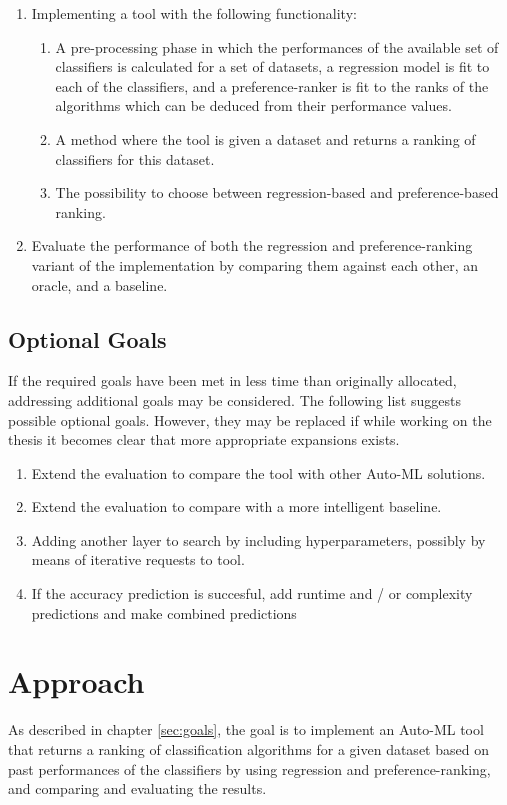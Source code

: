 \documentclass[12pt]{scrartcl}
\begin{document}
\begin{enumerate}
	\item Implementing a tool with the following functionality:
	\begin{enumerate}
		\item A pre-processing phase in which the performances of the available set of classifiers is calculated for a set of datasets, a regression model is fit to each of the classifiers, and a preference-ranker is fit to the ranks of the algorithms which can be deduced from their performance values.
		\item A method where the tool is given a dataset and returns a ranking of classifiers for this dataset.
		\item The possibility to choose between regression-based and preference-based ranking.
	\end{enumerate}
	\item Evaluate the performance of both the regression and preference-ranking variant of the implementation by comparing them against each other, an oracle, and a baseline.
\end{enumerate}

\subsection{Optional Goals}\label{subsec:optional_goals}
If the required goals have been met in less time than originally allocated, addressing additional goals may be considered. The following list suggests possible optional goals. However, they may be replaced if while working on the thesis it becomes clear that more appropriate expansions exists.

\begin{enumerate}
	\item Extend the evaluation to compare the tool with other Auto-ML solutions.
	\item Extend the evaluation to compare with a more intelligent baseline.
	\item Adding another layer to search by including hyperparameters, possibly by means of iterative requests to tool.
	\item If the accuracy prediction is succesful, add runtime and / or complexity predictions and make combined predictions
\end{enumerate}

\section{Approach}\label{sec:approach}
As described in chapter \ref{sec:goals}, the goal is to implement an Auto-ML tool that returns a ranking of classification algorithms for a given dataset based on past performances of the classifiers by using regression and preference-ranking, and comparing and evaluating the results. 
\end{document}
